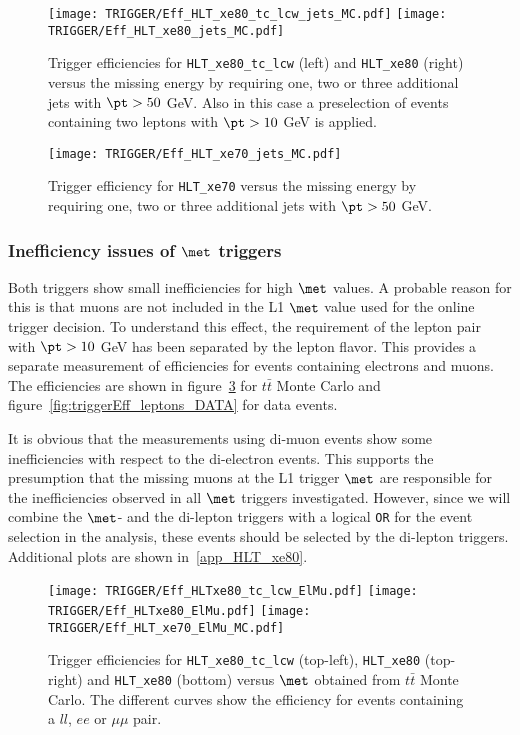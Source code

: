 \begin{figure}[htb!]
\centering
\texttt{[image: TRIGGER/Eff\_HLT\_xe80\_tc\_lcw\_jets\_MC.pdf]}
\texttt{[image: TRIGGER/Eff\_HLT\_xe80\_jets\_MC.pdf]}
\caption{Trigger efficiencies for \texttt{HLT\_xe80\_tc\_lcw} (left) and \texttt{HLT\_xe80} (right) versus the missing energy by requiring one, two or three additional jets with $\pt > 50$ GeV. Also in this case a preselection of events containing two leptons with $\pt > 10 $ GeV is applied.}
\label{fig:triggerEff_HLT_xe80_jets}
\end{figure}

\begin{figure}[htb!]
\centering
\texttt{[image: TRIGGER/Eff\_HLT\_xe70\_jets\_MC.pdf]}
\caption{Trigger efficiency for \texttt{HLT\_xe70} versus the missing energy by requiring one, two or three additional jets with $\pt > 50$ GeV.}
\label{fig:triggerEff_HLT_xe70_jets}
\end{figure}


\subsubsection{Inefficiency issues of $\met$ triggers}

Both triggers show small inefficiencies for high $\met$ values. A probable reason for this is that muons are not included in the L1 $\met$ value used for the online trigger decision. To understand this effect, the requirement of the lepton pair with $\pt > 10 $ GeV has been separated by the lepton flavor. This provides a separate measurement of efficiencies for events containing electrons and muons. The efficiencies are shown in figure~\ref{fig:triggerEff_leptons_MC} for $t\bar{t}$ Monte Carlo and figure~\ref{fig:triggerEff_leptons_DATA} for data events.

It is obvious that the measurements using di-muon events show some inefficiencies with respect to the di-electron events. This supports the presumption that the missing muons at the L1 trigger $\met$ are responsible for the inefficiencies observed in all $\met$ triggers investigated. However, since we will combine the $\met$- and the di-lepton triggers with a logical \texttt{OR} for the event selection in the analysis, these events should be selected by the di-lepton triggers. Additional plots are shown in~\ref{app_HLT_xe80}.

\begin{figure}[htb!]
\centering
\texttt{[image: TRIGGER/Eff\_HLTxe80\_tc\_lcw\_ElMu.pdf]}
\texttt{[image: TRIGGER/Eff\_HLTxe80\_ElMu.pdf]}
\texttt{[image: TRIGGER/Eff\_HLT\_xe70\_ElMu\_MC.pdf]}
\caption{Trigger efficiencies for \texttt{HLT\_xe80\_tc\_lcw} (top-left),  \texttt{HLT\_xe80} (top-right) and \texttt{HLT\_xe80} (bottom) versus $\met$ obtained from $t\bar{t}$ Monte Carlo. The different curves show the efficiency for events containing a $ll$, $ee$ or $\mu\mu$ pair.}
\label{fig:triggerEff_leptons_MC}
\end{figure}

